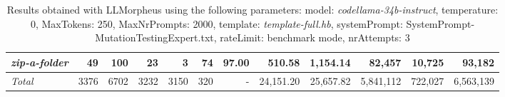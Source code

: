 \begin{table*}
{\begin{tabular}{l||r|r|r|r|r|r||r|r||r|r|r}
   \hline
   \textit{zip-a-folder} & 49 & 100 & 23 & 3 & 74 & 97.00 & 510.58 & 1,154.14 & 82,457 & 10,725 & 93,182 \\ 
   \hline
   \textit{Total} & 3376 & 6702 & 3232 & 3150 & 320 & - & 24,151.20  & 25,657.82 & 5,841,112 & 722,027 & 6,563,139 \\ 
 \end{tabular}
 }
 \caption{Results obtained with LLMorpheus using the following parameters: 
   model: \textit{codellama-34b-instruct}, 
   temperature: 0, 
   MaxTokens: 250, 
   MaxNrPrompts: 2000, 
   template: \textit{template-full.hb}, 
   systemPrompt: SystemPrompt-MutationTestingExpert.txt, 
   rateLimit: benchmark mode, 
   nrAttempts: 3  
 }
\end{table*}

